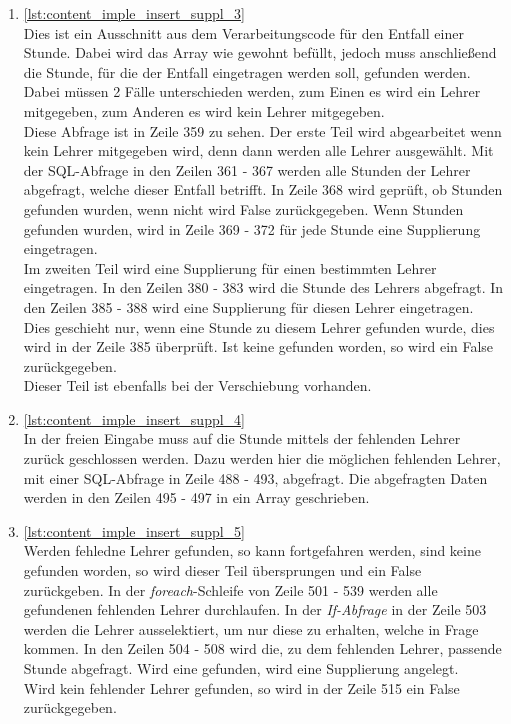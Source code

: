 \begin{enumerate}
\item \autoref{lst:content_imple_insert_suppl_3}\\
Dies ist ein Ausschnitt aus dem Verarbeitungscode für den Entfall einer Stunde. Dabei wird das Array wie gewohnt befüllt, jedoch muss anschließend die Stunde, für die der Entfall eingetragen werden soll, gefunden werden. Dabei müssen 2 Fälle unterschieden werden, zum Einen es wird ein Lehrer mitgegeben, zum Anderen es wird kein Lehrer mitgegeben.\\
Diese Abfrage ist in Zeile 359 zu sehen. Der erste Teil wird abgearbeitet wenn kein Lehrer mitgegeben wird, denn dann werden alle Lehrer ausgewählt. Mit der SQL-Abfrage in den Zeilen 361 - 367 werden alle Stunden der Lehrer abgefragt, welche dieser Entfall betrifft. In Zeile 368 wird geprüft, ob Stunden gefunden wurden, wenn nicht wird False zurückgegeben. Wenn Stunden gefunden wurden, wird in Zeile 369 - 372 für jede Stunde eine Supplierung eingetragen.\\
Im zweiten Teil wird eine Supplierung für einen bestimmten Lehrer eingetragen. In den Zeilen 380 - 383 wird die Stunde des Lehrers abgefragt. In den Zeilen 385 - 388 wird eine Supplierung für diesen Lehrer eingetragen. Dies geschieht nur, wenn eine Stunde zu diesem Lehrer gefunden wurde, dies wird in der Zeile 385 überprüft. Ist keine gefunden worden, so wird ein False zurückgegeben.\\
Dieser Teil ist ebenfalls bei der Verschiebung vorhanden.



\item \autoref{lst:content_imple_insert_suppl_4}\\
In der freien Eingabe muss auf die Stunde mittels der fehlenden Lehrer zurück geschlossen werden. Dazu werden hier die möglichen fehlenden Lehrer, mit einer SQL-Abfrage in Zeile 488 - 493, abgefragt. Die abgefragten Daten werden in den Zeilen 495 - 497 in ein Array geschrieben.



\item \autoref{lst:content_imple_insert_suppl_5}\\
Werden fehledne Lehrer gefunden, so kann fortgefahren werden, sind keine gefunden worden, so wird dieser Teil übersprungen und ein False zurückgeben. In der \textit{foreach}-Schleife von Zeile 501 - 539 werden alle gefundenen fehlenden Lehrer durchlaufen. In der \textit{If-Abfrage} in der Zeile 503 werden die Lehrer ausselektiert, um nur diese zu erhalten, welche in Frage kommen. In den Zeilen 504 - 508 wird die, zu dem fehlenden Lehrer, passende Stunde abgefragt. Wird eine gefunden, wird eine Supplierung angelegt.\\
Wird kein fehlender Lehrer gefunden, so wird in der Zeile 515 ein False zurückgegeben.


\end{enumerate}
